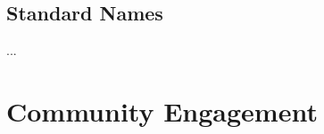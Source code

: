 \documentclass[12pt]{amsart}
\begin{document}
\subsection{Standard Names}

...









\section{Community Engagement}
\label{sec:community}
\end{document}
